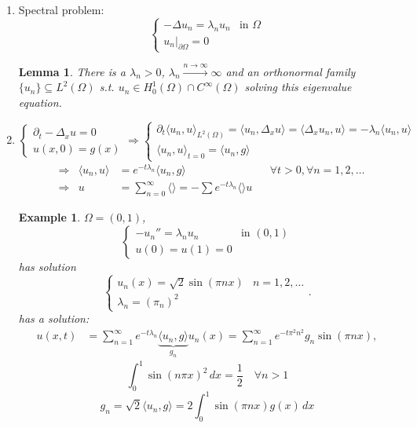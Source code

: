 \documentclass{report}
\theoremstyle{tommy}
\newtheorem{lem}[defn]{Lemma}
\newtheorem{eg}[defn]{Example}
\begin{document}
\begin{enumerate}[label=Step \arabic*:]
  \item Spectral problem:\[\begin{cases}
    -\Delta u_n = \lambda_n u_n &\text{in } \Omega \\ u_n|_{\partial \Omega} = 0
  \end{cases}\]
  \begin{lem}
    There is a \(\lambda_n > 0\), \(\lambda_n \xrightarrow{n \to \infty} \infty\) and an orthonormal family \(\{u_n\} \subseteq L^2(\Omega)\) s.t. \(u_n \in H_0^1(\Omega) \cap C^\infty(\Omega)\) solving this eigenvalue equation.
  \end{lem}
  \item \[\begin{cases}
    \partial_t - \Delta_x u = 0 \\ u(x,0) = g(x)
  \end{cases}
  \Rightarrow
  \begin{cases}
    \partial_t \langle u_n, u\rangle_{L^2(\Omega)} = \langle u_n, \Delta_x u\rangle = \langle \Delta_x u_n, u\rangle = -\lambda_n \langle u_n, u\rangle \\ \langle u_n, u\rangle_{t = 0} = \langle u_n, g \rangle
  \end{cases}\]
  \begin{align*}
    &\Rightarrow &\langle u_n, u\rangle &= e^{-t \lambda_n} \langle u_n, g\rangle &&\forall t > 0, \forall n = 1,2, \dots \\
    &\Rightarrow & u&= \sum_{n=0}^\infty \langle \rangle = - \sum e^{-t \lambda_n} \langle \rangle u
  \end{align*}
    
  \begin{eg}
    \(\Omega = (0,1)\), \[\begin{cases}
      - u_n'' = \lambda_n u_n &\text{in } (0,1) \\ u(0) = u(1) = 0
    \end{cases}\]
    has solution
    \[
      \begin{cases}
        u_n(x) = \sqrt{2}\sin(\pi n x)& n = 1,2, \dots \\ \lambda_n = (\pi_n)^2
      \end{cases}.
    \]
    has a solution:
    \begin{align*}
      u(x,t) &= \sum_{n=1}^\infty e^{-t\lambda_n} \underbrace{\langle u_n, g \rangle}_{g_n} u_n(x) = \sum_{n=1}^\infty e^{- t \pi^2 n^2} g_n \sin(\pi n x),
    \end{align*}
    \[\int_0^1 \sin(n \pi x)^2 \,dx = \frac{1}{2} \quad \forall n > 1\]
    \[g_n = \sqrt{2} \langle u_n, g\rangle = 2 \int_0^1 \sin(\pi n x) g(x)\, dx\]
  \end{eg}
\end{enumerate}
\end{document}

